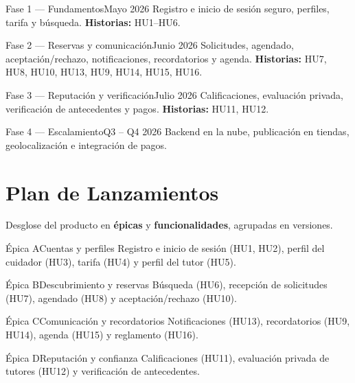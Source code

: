 \documentclass[11pt,a4paper]{article}
\begin{document}
\begin{fase}{Fase 1 — Fundamentos}{Mayo 2026}
Registro e inicio de sesión seguro, perfiles, tarifa y búsqueda. \textbf{Historias:} HU1–HU6.
\end{fase}
\begin{fase}{Fase 2 — Reservas y comunicación}{Junio 2026}
Solicitudes, agendado, aceptación/rechazo, notificaciones, recordatorios y agenda.
\textbf{Historias:} HU7, HU8, HU10, HU13, HU9, HU14, HU15, HU16.
\end{fase}
\begin{fase}{Fase 3 — Reputación y verificación}{Julio 2026}
Calificaciones, evaluación privada, verificación de antecedentes y pagos.
\textbf{Historias:} HU11, HU12.
\end{fase}
\begin{fase}{Fase 4 — Escalamiento}{Q3 – Q4 2026}
Backend en la nube, publicación en tiendas, geolocalización e integración de pagos.
\end{fase}

\section{Plan de Lanzamientos}
Desglose del producto en \textbf{épicas} y \textbf{funcionalidades}, agrupadas en versiones.

\begin{epica}{Épica A}{Cuentas y perfiles}
Registro e inicio de sesión (HU1, HU2), perfil del cuidador (HU3), tarifa (HU4) y perfil del tutor (HU5).
\end{epica}
\begin{epica}{Épica B}{Descubrimiento y reservas}
Búsqueda (HU6), recepción de solicitudes (HU7), agendado (HU8) y aceptación/rechazo (HU10).
\end{epica}
\begin{epica}{Épica C}{Comunicación y recordatorios}
Notificaciones (HU13), recordatorios (HU9, HU14), agenda (HU15) y reglamento (HU16).
\end{epica}
\begin{epica}{Épica D}{Reputación y confianza}
Calificaciones (HU11), evaluación privada de tutores (HU12) y verificación de antecedentes.
\end{epica}
\end{document}
